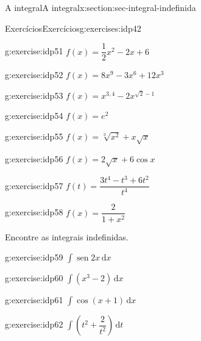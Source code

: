 \documentclass[oneside,10pt,]{article}
\numberwithin{equation}{section}
\newcommand{\dd}{\mathrm{d}}
\DeclareMathOperator{\sin}{sen}
\begin{document}
\begin{sectionptx}{A integral}{}{A integral}{}{}{x:section:sec-integral-indefinida}
\begin{exercises-subsection}{Exercícios}{}{Exercícios}{}{}{g:exercises:idp42}
\begin{exercisegroupcol}{2}
\begin{divisionexerciseegcol}{9}{}{}{g:exercise:idp51}
\(f(x) = \dfrac{1}{2}x^2 - 2x + 6\)\end{divisionexerciseegcol}%
\begin{divisionexerciseegcol}{10}{}{}{g:exercise:idp52}%
\(f(x) = 8x^9 - 3 x^6 + 12 x^3\)\end{divisionexerciseegcol}%
\begin{divisionexerciseegcol}{11}{}{}{g:exercise:idp53}%
\(f(x) = x^{3,4} - 2x^{\sqrt{2}-1}\)\end{divisionexerciseegcol}%
\begin{divisionexerciseegcol}{12}{}{}{g:exercise:idp54}%
\(f(x) =e^2\)\end{divisionexerciseegcol}%
\begin{divisionexerciseegcol}{13}{}{}{g:exercise:idp55}%
\(f(x) = \sqrt[3]{x^2} + x \sqrt{x}\)\end{divisionexerciseegcol}%
\begin{divisionexerciseegcol}{14}{}{}{g:exercise:idp56}%
\(f(x) = 2\sqrt{x} + 6 \cos x\)\end{divisionexerciseegcol}%
\begin{divisionexerciseegcol}{15}{}{}{g:exercise:idp57}%
\(f(t) = \dfrac{3t^4 - t^3+6t^2}{t^4}\)\end{divisionexerciseegcol}%
\begin{divisionexerciseegcol}{16}{}{}{g:exercise:idp58}%
\(f(x) = \dfrac{2}{1+x^2}\)\end{divisionexerciseegcol}%
\end{exercisegroupcol}
\par\medskip\noindent
\par\medskip\noindent%
%
Encontre as integrais indefinidas.%
\begin{exercisegroupcol}{2}
\begin{divisionexerciseegcol}{17}{}{}{g:exercise:idp59}%
\(\displaystyle\int\sin{2x}\,\dd x\)\end{divisionexerciseegcol}%
\begin{divisionexerciseegcol}{18}{}{}{g:exercise:idp60}%
\(\displaystyle\int \left(x^3-2\right)\,\dd x\)\end{divisionexerciseegcol}%
\begin{divisionexerciseegcol}{19}{}{}{g:exercise:idp61}%
\(\displaystyle\int\cos(x+1)\,\dd x\)\end{divisionexerciseegcol}%
\begin{divisionexerciseegcol}{20}{}{}{g:exercise:idp62}%
\(\displaystyle\int\left(t^2 + \dfrac{2}{t^2}\right)\,\dd t\)\end{divisionexerciseegcol}%

\end{exercisegroupcol}
\end{exercises-subsection}
\end{sectionptx}
\end{document}

